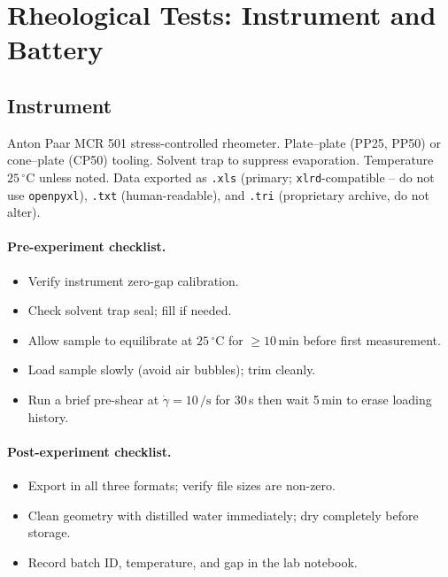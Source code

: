 \documentclass[11pt,a4paper]{article}
\newcommand{\gd}{\dot{\gamma}}
\begin{document}
\section{Rheological Tests: Instrument and Battery}
\label{sec:tests}

\subsection{Instrument}

Anton Paar MCR 501 stress-controlled rheometer. Plate--plate (PP25,
PP50) or cone--plate (CP50) tooling. Solvent trap to suppress
evaporation. Temperature $25\,^\circ$C unless noted. Data exported as
\texttt{.xls} (primary; \texttt{xlrd}-compatible -- do not use
\texttt{openpyxl}), \texttt{.txt} (human-readable), and \texttt{.tri}
(proprietary archive, do not alter).

\paragraph{Pre-experiment checklist.}
\begin{itemize}[leftmargin=1.4em,itemsep=1pt]
\item[$\square$] Verify instrument zero-gap calibration.
\item[$\square$] Check solvent trap seal; fill if needed.
\item[$\square$] Allow sample to equilibrate at $25\,^\circ$C for
  $\geq 10\,\si{\minute}$ before first measurement.
\item[$\square$] Load sample slowly (avoid air bubbles); trim cleanly.
\item[$\square$] Run a brief pre-shear at $\gd=10\,\si{\per\s}$ for
  30\,\si{\s} then wait 5\,\si{\minute} to erase loading history.
\end{itemize}

\paragraph{Post-experiment checklist.}
\begin{itemize}[leftmargin=1.4em,itemsep=1pt]
\item[$\square$] Export in all three formats; verify file sizes are
  non-zero.
\item[$\square$] Clean geometry with distilled water immediately;
  dry completely before storage.
\item[$\square$] Record batch ID, temperature, and gap in the lab notebook.
\end{itemize}
\end{document}
